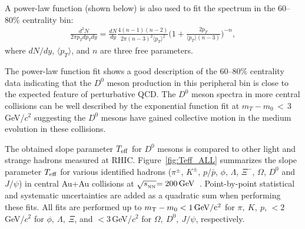 \documentclass[%
 reprint,	
 amsmath,amssymb,
 aps,
 prc,
]{revtex4-1}
\begin{document}
A power-law function (shown below) is also used to fit the spectrum in the 60--80\% centrality bin:
\begin{equation}
  \begin{aligned}
\frac{d^2N}{2\pi p_{T}dp_{T}dy} = \frac{dN}{dy}\frac{4(n-1)(n-2)}{2\pi (n-3)^2\langle p_{T} \rangle ^2}\bigg(1+\frac{2p_{T}}{\langle p_{T} \rangle (n-3)}\bigg)^{-n},
  \end{aligned}
\label{equ:equation6}
\end{equation}
where $dN/dy$, $\langle p_{T}\rangle$, and $n$ are three free parameters.

The power-law function fit shows a good description of the 60--80\% centrality data indicating that the $D^0$ meson production in this peripheral bin is close to the expected feature of perturbative QCD. The $D^0$ meson spectra in more central collisions can be well described by the exponential function fit at $m_{T}-m_{0}$\,$<$\,3\,GeV/$c^2$ suggesting the $D^0$ mesons have gained collective motion in the medium evolution in these collisions.




The obtained slope parameter $T_{\rm eff}$ for $D^0$ mesons is compared to other light and strange hadrons measured at RHIC. %
Figure~\ref{fig:Teff_ALL} summarizes the slope parameter $T_{\rm eff}$ for various identified hadrons ($\pi^{\pm}$, $K^{\pm}$, $p$/$\bar{p}$, $\phi$, $\Lambda$, $\Xi^-$, $\Omega$, $D^0$ and $J/\psi$) in central Au+Au collisions at $\sqrt{s_{_{\rm NN}}} {\rm = 200\,GeV}$~\cite{Adams:2003xp,Abelev:2007rw,Adams:2006ke,Adamczyk:2013tvk}. Point-by-point statistical and systematic uncertainties are added as a quadratic sum when performing these fits. All fits are performed up to $m_{\rm T} - m_{0} <1\,\rm{GeV}/c^2$ for $\pi,\ K,\ p$, $<2$\,GeV/$c^2$ for $\phi,\ \Lambda,\ \Xi$, and $<3$\,GeV/$c^2$ for $\Omega,\ D^{0},\ J/\psi$, respectively. 
\end{document}
